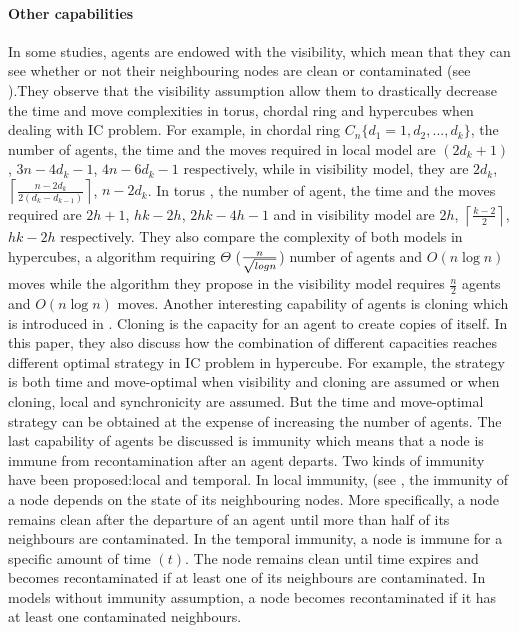 \paragraph{Other capabilities}
In some studies, agents are endowed with the visibility, which mean that they can see whether or not their neighbouring nodes are clean or contaminated (see \cite{M.Huang, M.Huang1}).They observe that the visibility assumption allow them to drastically decrease the time and move complexities in torus, chordal ring and hypercubes when dealing with IC problem. For example, in chordal ring $C_n\{d_1=1,d_2,...,d_k\}$, the number of agents, the time and the moves required in local model are $(2d_k+1)$, $3n-4d_k-1$, $4n-6d_k-1$ respectively, while in visibility model, they are $2d_k$, $\left \lceil \frac{n-2d_{k}}{2(d_{k}-d_{k-1})} \right \rceil$, $n-2d_k$. In torus , the number of agent, the time and the moves required are $2h+1$, $hk-2h$, $2hk-4h-1$ and in visibility model are $2h$, $\left \lceil \frac{k-2}{2} \right \rceil$, $hk-2h$ respectively. They also compare the complexity of both models in hypercubes, a algorithm requiring $\Theta$  ($n \over { \sqrt {log n}} $) number of agents and $O(n \log n)$ moves while the algorithm they propose in the visibility model requires $\frac{n}{2}$ agents and $O(n \log n)$ moves.
Another interesting capability of agents is cloning which is introduced in \cite{M.Huang1}. Cloning is the capacity for an agent to create copies of itself. In this paper, they also discuss how the combination of different capacities reaches different optimal strategy in IC problem in hypercube. For example, the strategy is both time and move-optimal when visibility and cloning are assumed or when cloning, local and synchronicity are assumed. But the time and move-optimal strategy can be obtained at the expense of increasing the number of agents.
The last capability of agents be discussed is immunity which means that a node is immune from recontamination after an agent departs. Two kinds of immunity have been proposed:local and temporal. In local immunity, (see
\cite{Flocchini6,N.Santoro}, the immunity of a node depends on the state of its neighbouring nodes. More specifically, a node remains clean after the departure of an agent until more than half of its neighbours are contaminated. In the temporal immunity, a node is immune for a specific amount of time $(t)$. The node remains clean until time expires and becomes recontaminated if at least one of its neighbours are contaminated. In models without immunity assumption, a node becomes recontaminated if it has at least one contaminated neighbours.

